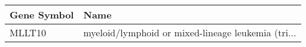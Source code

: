 \begin{tabular}{ll}
\toprule
Gene Symbol &                                               Name \\
\midrule
     MLLT10 & myeloid/lymphoid or mixed-lineage leukemia (tri... \\
\bottomrule
\end{tabular}
